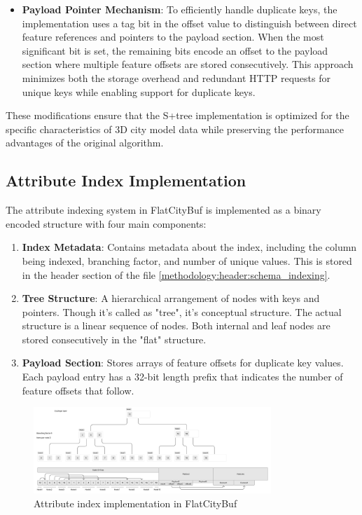 \begin{itemize}
\item \textbf{Payload Pointer Mechanism}: To efficiently handle duplicate keys, the implementation uses a tag bit in the offset value to distinguish between direct feature references and pointers to the payload section. When the most significant bit is set, the remaining bits encode an offset to the payload section where multiple feature offsets are stored consecutively. This approach minimizes both the storage overhead and redundant HTTP requests for unique keys while enabling support for duplicate keys.

\end{itemize}

These modifications ensure that the S+tree implementation is optimized for the specific characteristics of 3D city model data while preserving the performance advantages of the original algorithm.

\subsection{Attribute Index Implementation}
\label{methodology:attribute_index:implementation}

The attribute indexing system in FlatCityBuf is implemented as a binary encoded structure with four main components:

\begin{enumerate}
\item \textbf{Index Metadata}: Contains metadata about the index, including the column being indexed, branching factor, and number of unique values. This is stored in the header section of the file \autoref{methodology:header:schema_indexing}.
\item \textbf{Tree Structure}: A hierarchical arrangement of nodes with keys and pointers. Though it's called as "tree", it's conceptual structure. The actual structure is a linear sequence of nodes. Both internal and leaf nodes are stored consecutively in the "flat" structure.
\item \textbf{Payload Section}: Stores arrays of feature offsets for duplicate key values. Each payload entry has a 32-bit length prefix that indicates the number of feature offsets that follow.
\end{enumerate}

\begin{figure}[htbp]
\centering
\includegraphics[width=0.8\textwidth]{figs/methodology/attribute_index.png}
\caption{Attribute index implementation in FlatCityBuf}
\label{fig:methodology:attribute_index}
\end{figure}

